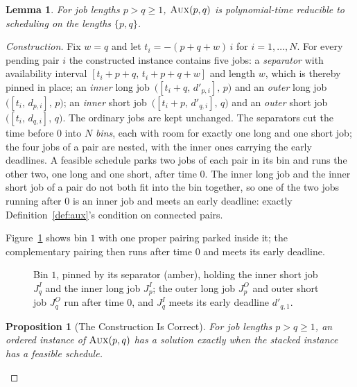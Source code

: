 \documentclass[11pt,a4paper]{article}
\newtheorem{lemma}{Lemma}
\newtheorem{proposition}{Proposition}
\theoremstyle{definition}
\newcommand{\AUX}{\textsc{Aux}}
\begin{document}
\setcounter{lemma}{0}
\begin{lemma}
\label{lem:lemma1}
For job lengths $p>q\ge 1$, $\AUX(p,q)$ is polynomial-time reducible to
scheduling on the lengths $\{p,q\}$.
\end{lemma}

\begin{proof}[Construction]
Fix $w=q$ and let $t_i=-(p+q+w)\,i$ for $i=1,\dots,N$. For every pending
pair $i$ the constructed instance contains five jobs: a \emph{separator}
with availability interval $[t_i+p+q,\,t_i+p+q+w]$ and length $w$, which is
thereby pinned in place; an \emph{inner} long job~$\big([t_i+q,\,d'_{p,i}],\,p\big)$
and an \emph{outer} long job~$\big([t_i,\,d_{p,i}],\,p\big)$; an \emph{inner}
short job~$\big([t_i+p,\,d'_{q,i}],\,q\big)$ and an \emph{outer} short
job~$\big([t_i,\,d_{q,i}],\,q\big)$. The ordinary jobs are kept unchanged.
The separators cut the time before $0$ into $N$ \emph{bins}, each with room
for exactly one long and one short job; the four jobs of a pair are nested,
with the inner ones carrying the early deadlines. A feasible schedule parks
two jobs of each pair in its bin and runs the other two, one long and one
short, after time $0$. The inner long job and the inner short job of a pair
do not both fit into the bin together, so one of the two jobs running after
$0$ is an inner job and meets an early deadline: exactly
Definition~\ref{def:aux}'s condition on connected pairs.

Figure~\ref{fig:stacked} shows bin $1$ with one proper pairing parked inside it;
the complementary pairing then runs after time $0$ and meets its early
deadline.

\begin{figure}[ht]
\centering

\caption{Bin $1$, pinned by its separator (amber), holding the inner short
job $J^I_q$ and the inner long job $J^I_p$; the outer long job $J^O_p$ and
outer short job $J^O_q$ run after time $0$, and $J^I_q$ meets its early
deadline $d'_{q,1}$.}
\label{fig:stacked}
\end{figure}

\begin{proposition}[The Construction Is Correct]
For job lengths $p>q\ge 1$, an ordered instance of $\AUX(p,q)$ has a solution
exactly when the stacked instance has a feasible schedule.
\end{proposition}


\end{proof}
\end{document}
